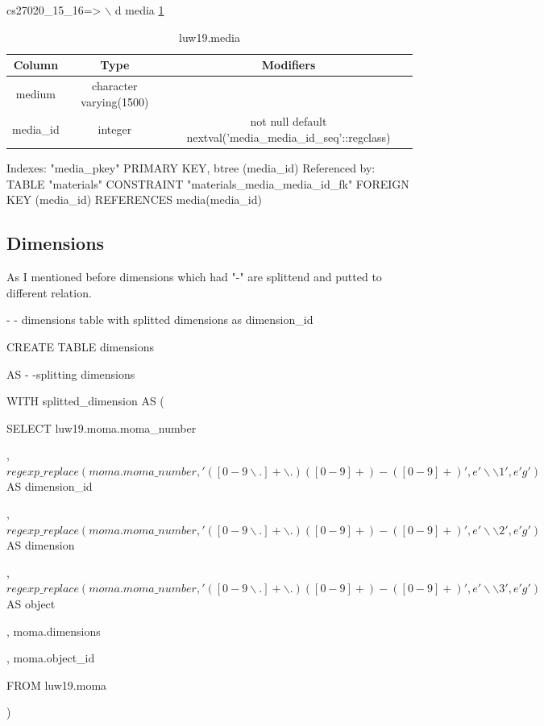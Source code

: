\documentclass[journal,transmag]{IEEEtran}
\begin{document}
cs27020\_15\_16=> $\backslash$ d media \ref{media}
\newline

\begin{table}[]
\centering
\caption{luw19.media}
\label{media}
\begin{tabular}{c|c|c}
Column    & Type                    & Modifiers                                                   \\ \hline
medium    & character varying(1500) &                                                             \\
media\_id & integer                 & not null default nextval('media\_media\_id\_seq'::regclass)
\end{tabular}
\end{table}

Indexes:
    "media\_pkey" PRIMARY KEY, btree (media\_id)
Referenced by:
    TABLE "materials" CONSTRAINT "materials\_media\_media\_id\_fk" FOREIGN KEY (media\_id) REFERENCES media(media\_id)

\subsection {Dimensions}

As I mentioned before dimensions which had "-" are splittend and putted to different relation. 

- - dimensions table with splitted dimensions as dimension\_id

CREATE TABLE dimensions

  AS
  - -splitting dimensions

WITH splitted\_dimension AS (

        SELECT luw19.moma.moma\_number

        , $regexp\_replace(moma.moma\_number, '([0-9\backslash.]+\backslash.)([0-9]+)-([0-9]+)', e'\backslash \backslash 1', e'g')$ AS dimension\_id

        , $regexp\_replace(moma.moma\_number, '([0-9\backslash.]+\backslash.)([0-9]+)-([0-9]+)', e'\backslash \backslash 2', e'g')$ AS dimension

        , $regexp\_replace(moma.moma\_number, '([0-9\backslash.]+\backslash.)([0-9]+)-([0-9]+)', e'\backslash \backslash3', e'g')$ AS object

        , moma.dimensions

        , moma.object\_id

        FROM luw19.moma

        )
\end{document}
